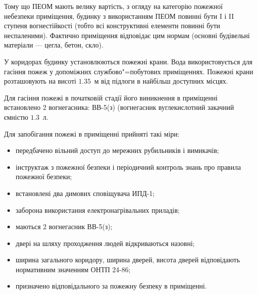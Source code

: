 \documentclass{diploma}
\begin{document}
      Тому що ПЕОМ мають велику вартість, з огляду на категорію пожежної
      небезпеки приміщення, будинку з використанням ПЕОМ повинні бути I і II
      ступеня вогнестійкості (тобто всі конструктивні елементи повинні бути
      неспаленими).
      Фактично приміщення відповідає цим нормам (основні будівельні матеріали
      --- цегла, бетон, скло).

      У коридорах будинку установлюються пожежні крани.
      Вода використовується для гасіння пожеж у допоміжних службово"=побутових
      приміщеннях.
      Пожежні крани розташовують на висоті $1.35$~м від підлоги в найбільш
      доступних місцях.

      Для гасіння пожежі в початковій стадії його виникнення в приміщенні
      встановлено 2 вогнегасника: ВВ-5(з) (вогнегасник вуглекислотний закачний
      ємністю $1.3$~л.

      Для запобігання пожежі в приміщенні прийняті такі міри:
      \begin{itemize}
        \item передбачено вільний доступ до мережних рубильників і вимикачів;
        \item інструктаж з пожежної безпеки і періодичний контроль знань про
          правила пожежної безпеки;
        \item встановлені два димових сповіщувача ИПД-1;
        \item заборона використання електронагрівальних приладів;
        \item маються 2 вогнегасник ВВ-5(з);
        \item двері на шляху проходження людей відкриваються назовні;
        \item ширина загального коридору, ширина дверей, висота дверей
          відповідають нормативним значенням ОНТП 24-86;
        \item призначено відповідального за пожежну безпеку в приміщенні.
      \end{itemize}
      \clearpage
\end{document}
